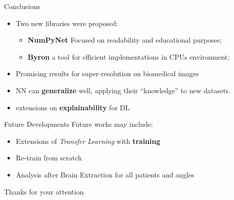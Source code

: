 \documentclass[10pt, unicode]{beamer}
\begin{document}
\begin{frame}{Conclusions}
\Large
  \begin{itemize}
   \item Two new libraries were proposed:
   \begin{itemize}
      \item {\bf NumPyNet} Focused on readability and educational purposes;
      \item {\bf Byron} a tool for efficient implementations in CPUs environment;
   \end{itemize}
   \item Promising results for super-resolution on biomedical images
   \item NN can \textbf{generalize} well, applying their ``knowledge'' to new datasets. 
   \item extensions on \textbf{explainability} for DL 
  \end{itemize}
  
\end{frame}


\begin{frame}{Future Developments}
  \large
  Future works may include:
  \begin{itemize}
    \item Extensions of {\it Transfer Learning} with \textbf{training}
    \item Re-train from scratch
    \item Analysis after Brain Extraction for all patients and angles
  \end{itemize}

\end{frame}

\begin{frame}
 \centering
 \huge
 Thanks for your attention
\end{frame}

 
\end{document}
